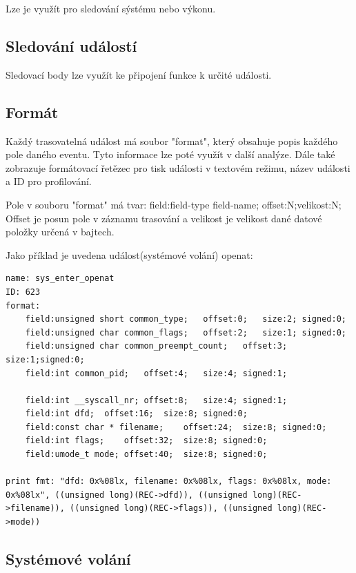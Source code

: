 Lze je využít pro sledování sýstému nebo výkonu.

\subsection {Sledování událostí}
Sledovací body lze využít ke připojení funkce k určité události.

\subsection*{Formát}
Každý trasovatelná událost má soubor "format", který obsahuje popis každého pole daného eventu. Tyto informace lze poté využít v další
analýze. Dále také zobrazuje formátovací řetězec pro tisk události v textovém režimu, název události a ID pro profilování.

Pole v souboru "format" má tvar:
field:field-type field-name; offset:N;velikost:N;
Offset je posun pole v záznamu trasování a velikost je velikost dané datové položky určená v bajtech.

Jako příklad je uvedena událost(systémové volání) openat:

\begin{verbatim}
name: sys_enter_openat
ID: 623
format:
	field:unsigned short common_type;	offset:0;	size:2;	signed:0;
	field:unsigned char common_flags;	offset:2;	size:1;	signed:0;
	field:unsigned char common_preempt_count;	offset:3;	size:1;signed:0;
	field:int common_pid;	offset:4;	size:4;	signed:1;

	field:int __syscall_nr;	offset:8;	size:4;	signed:1;
	field:int dfd;	offset:16;	size:8;	signed:0;
	field:const char * filename;	offset:24;	size:8;	signed:0;
	field:int flags;	offset:32;	size:8;	signed:0;
	field:umode_t mode;	offset:40;	size:8;	signed:0;

print fmt: "dfd: 0x%08lx, filename: 0x%08lx, flags: 0x%08lx, mode: 0x%08lx", ((unsigned long)(REC->dfd)), ((unsigned long)(REC->filename)), ((unsigned long)(REC->flags)), ((unsigned long)(REC->mode))
\end{verbatim}

\subsection{Systémové volání}
\label{sec:systemoveVolani}

